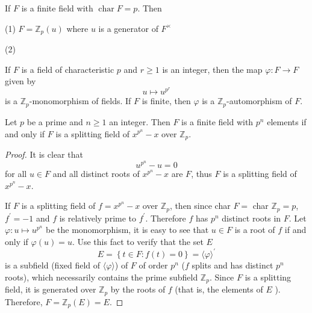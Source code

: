 \begin{corollary}
    If $F$ is a finite field with $\operatorname{char} F =p$. Then

    (1) $F = \mathbb{Z}_p\left(u\right)$ where $u$ is a generator of $F^\times$

    (2)
\end{corollary}

\begin{lemma}
    If $F$ is a field of characteristic $p$ and $r \geq 1$ is an integer, then the map $\varphi: F \rightarrow F$ given by
    \begin{equation*}
        u \mapsto u^{p^r}
    \end{equation*}
    is a $\mathbb{Z}_{p}$-monomorphism of fields.
    If $F$ is finite, then $\varphi$ is a $\mathbb{Z}_p$-automorphism of $F$.
\end{lemma}

\begin{theorem}
    Let $p$ be a prime and $n \geq 1$ an integer.
    Then $F$ is a finite field with $p^{n}$ elements if and only if $F$ is a splitting field of $x^{p^{n}}-x$ over $\mathbb{Z}_{p}$.
    \begin{proof}
        It is clear that
        \begin{equation*}
            u^{p^n}-u=0
        \end{equation*}
        for all $u\in F$ and all distinct roots of $x^{p^n}-x$ are $F$, thus $F$ is a splitting field of $x^{p^{n}}-x$.

        If $F$ is a splitting field of $f=x^{p^n}-x$ over $\mathbb{Z}_p$, then since char $F=$ char $\mathbb{Z}_p=p$, $f^{\prime}=-1$ and $f$ is relatively prime to $f^{\prime}$. Therefore $f$ has $p^n$ distinct roots in $F$.
        Let $\varphi: u \mapsto u^{p^n}$ be the monomorphism, it is easy to see that $u \in F$ is a root of $f$ if and only if $\varphi(u)=u$. Use this fact to verify that the set $E$
        \begin{equation*}
            E
            =
            \left\{t\in F: f(t)=0\right\}
            =
            \langle \varphi\rangle^\prime
        \end{equation*}
        is a subfield (fixed field of $\langle\varphi\rangle$) of $F$ of order $p^n$ ($f$ splits and has distinct $p^n$ roots), which necessarily contains the prime subfield $\mathbb{Z}_p$.
        Since $F$ is a splitting field, it is generated over $\mathbb{Z}_p$ by the roots of $f$ (that is, the elements of $E$ ). Therefore, $F=\mathbb{Z}_p(E)=E$.
    \end{proof}
\end{theorem}

